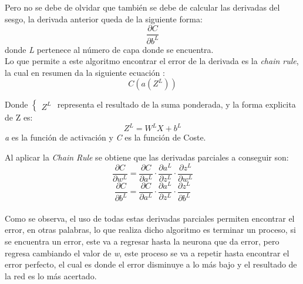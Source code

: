             Pero no se debe de olvidar que también se debe de calcular las derivadas del sesgo, la derivada anterior
            queda de la siguiente forma:
            \begin{equation*}
                \frac{\partial C}{\partial b^L}
            \end{equation*}
            donde \textit{L} pertenece al n\'umero de capa donde se encuentra. \\
            
            Lo que permite a este algoritmo encontrar el error de la derivada es la \textit{chain rule}, la cual en resumen 
            da la siguiente ecuaci\'on :
            \begin{equation*}
                C(a(Z^L))
            \end{equation*}

            Donde 
            $\begin{cases}
                Z^L
            \end{cases}$
            representa el resultado de la suma ponderada, y la forma explicita de Z es:
            \begin{equation*}
                Z^L = W^LX + b^L
            \end{equation*}
            \textit{a} es la funci\'on de activaci\'on 
            y \textit{C} es la funci\'on de Coste.

            Al aplicar la \textit{Chain Rule} se obtiene que las derivadas parciales a conseguir son:
            \begin{equation*}
                \frac{\partial C}{\partial w^L} = \frac{\partial C}{\partial a^L} \cdot \frac{\partial a^L}{\partial z^L} \cdot \frac{\partial z^L}{\partial w^L} 
            \end{equation*}
            \begin{equation*}
                \frac{\partial C}{\partial b^L} = \frac{\partial C}{\partial a^L} \cdot \frac{\partial a^L}{\partial z^L} \cdot \frac{\partial z^L}{\partial b^L}
            \end{equation*}
            \\

            Como se observa, el uso de todas estas derivadas parciales permiten encontrar el error, en otras palabras, lo que realiza dicho algoritmo es terminar un proceso, si se encuentra un error, este va a regresar
            hasta la neurona que da error, pero regresa cambiando el valor de \textit{w}, este proceso se va a 
            repetir hasta encontrar el error perfecto, el cual es donde el error disminuye a lo m\'as bajo y el resultado
            de la red es lo m\'as acertado.\\


